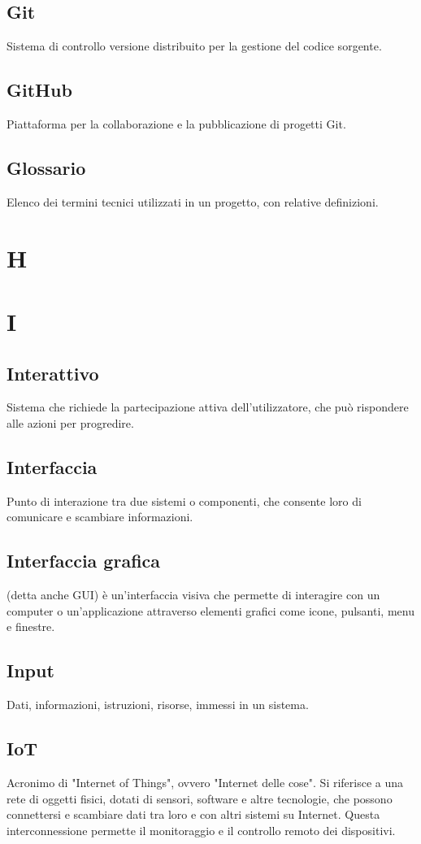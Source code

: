 \documentclass[a4paper,12pt]{article}
\begin{document}
          \subsection*{Git}
			Sistema di controllo versione distribuito per la gestione del codice sorgente.
          \subsection*{GitHub}
			Piattaforma per la collaborazione e la pubblicazione di progetti Git.
          \subsection*{Glossario}
			Elenco dei termini tecnici utilizzati in un progetto, con relative definizioni.
        
\newpage
        \section{H}
        
\newpage
        \section{I}
        
          \subsection*{Interattivo}
			Sistema che richiede la partecipazione attiva dell'utilizzatore, che può rispondere alle azioni per progredire.
          \subsection*{Interfaccia}
			Punto di interazione tra due sistemi o componenti, che consente loro di comunicare e scambiare informazioni.
          \subsection*{Interfaccia grafica}
			(detta anche GUI) è un'interfaccia visiva che permette di interagire con un computer o un'applicazione attraverso elementi grafici come icone, pulsanti, menu e finestre.
          \subsection*{Input}
			Dati, informazioni, istruzioni, risorse, immessi in un sistema.
          \subsection*{IoT}
			Acronimo di "Internet of Things", ovvero "Internet delle cose". Si riferisce a una rete di oggetti fisici, dotati di sensori, software e altre tecnologie, che possono connettersi e scambiare dati tra loro e con altri sistemi su Internet. Questa interconnessione permette il monitoraggio e il controllo remoto dei dispositivi.
        
\end{document}
